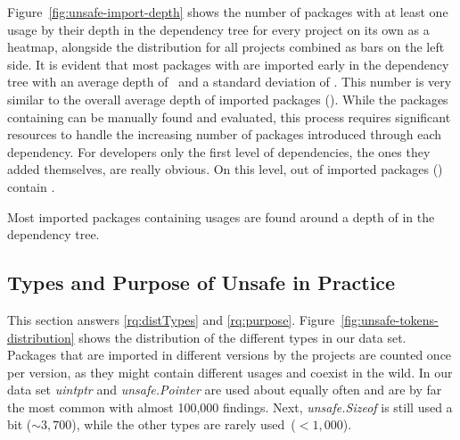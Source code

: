 Figure~\ref{fig:unsafe-import-depth} shows the number of packages with at least one \unsafe{} usage by their depth in the dependency tree for every project on its own as a heatmap, alongside the distribution for all projects combined as bars on the left side.
It is evident that most packages with \unsafe{} are imported early in the dependency tree with an average depth of \averageUnsafeImportDepth{}~and a standard deviation of \stdUnsafeImportDepth{}.
This number is very similar to the overall average depth of imported packages (\averageGeneralImportDepth{}). %
While the packages containing \unsafe{} can be manually found and evaluated, this process requires significant resources to handle the increasing number of packages introduced through each dependency. 
For developers only the first level of dependencies, the ones they added themselves, are really obvious.
On this level, \levelOneImportedUnsafePackagesCount{} out of \ImportedUnsafePackagesCount{} imported packages (\levelOneImportedUnsafePackagesShare{}) contain \unsafe{}.

\begin{tcolorbox}[boxsep=1pt, enlarge top by=5pt, title=Answer to \ref{rq:depsDepth}]
Most imported packages containing \unsafe{} usages are found around a depth of  in the dependency tree.
\end{tcolorbox}




\subsection{Types and Purpose of Unsafe in Practice}
\label{sec:eval:labeledData}

This section answers \ref{rq:distTypes} and \ref{rq:purpose}.
%
Figure~\ref{fig:unsafe-tokens-distribution} shows the distribution of the different \unsafe{} types in our data set.
Packages that are imported in different versions by the projects are counted once per version, as they might contain different \unsafe{} usages and coexist in the wild.
In our data set \textit{uintptr} and \textit{unsafe.Pointer} are used about equally often and are by far the most common with almost 100,000 findings. 
Next, \textit{unsafe.Sizeof} is still used a bit ($\sim 3,700$), while the other \unsafe{} types are rarely used~($< 1,000$).

